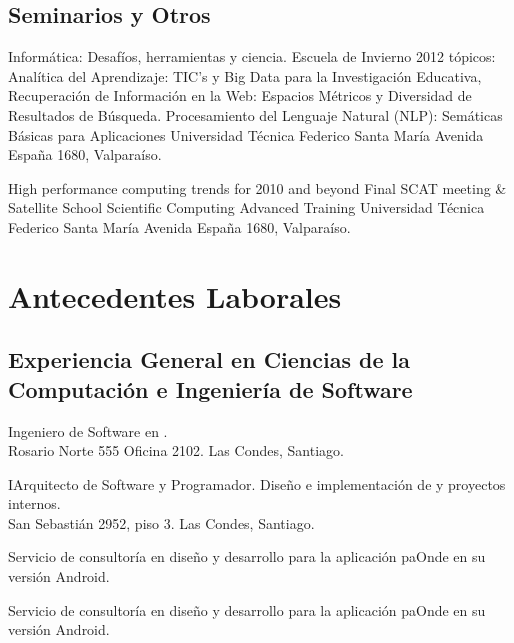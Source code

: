 \documentclass[11pt,letterpaper,roman]{moderncv}
\begin{document}
\subsection{Seminarios y Otros}

 {Informática: Desafíos, herramientas y ciencia.}
{Escuela de Invierno 2012} {tópicos: Analítica del Aprendizaje: TIC's y Big Data
para la Investigación Educativa, Recuperación de Información en la Web: Espacios
Métricos y Diversidad de Resultados de Búsqueda. Procesamiento del Lenguaje
Natural (NLP): Semáticas Básicas para Aplicaciones} {Universidad T\'ecnica
Federico Santa Mar\'ia} {Avenida España 1680, Valpara\'iso.}
	
	
 {High performance computing trends for 2010 and beyond}
{Final SCAT meeting \& Satellite School} {Scientific Computing Advanced
Training} {Universidad T\'ecnica Federico Santa Mar\'ia} {Avenida España 1680,
Valpara\'iso.}


\section{Antecedentes Laborales}



\subsection{Experiencia General en Ciencias de la Computación e Ingeniería de
Software}

 {\se} {\instagisSPA} {\stgo} {}
{Ingeniero de Software en \instagis. \\ Rosario Norte 555 Oficina 2102. Las Condes, Santiago.}


 {\pe} {\mapcity} {\stgo} {}
{IArquitecto de Software y Programador. Diseño e implementación de \mientorno   y proyectos internos. \\ San Sebastián 2952, piso 3. Las Condes, Santiago.}

 {\scd} {\paonde} {\stgo} {}
{Servicio de consultoría en diseño y desarrollo para la aplicación paOnde en
su versión Android.}

 {\scd} {\paonde} {\stgo} {}
{Servicio de consultoría en diseño y desarrollo para la aplicación paOnde en
su versión Android.}
\end{document}
